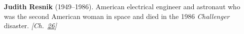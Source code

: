 \textbf{Judith Resnik} (1949–1986). American electrical engineer and astronaut who was the second American woman in space and died in the 1986 \emph{Challenger} disaster. \emph{[Ch.~\hyperref[ch:jewishcalendar]{26}]}

